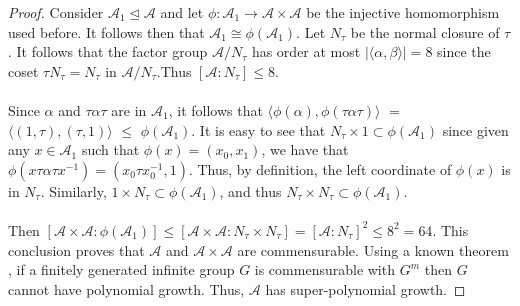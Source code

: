 \documentclass[11pt]{amsart}
\theoremstyle{definition}
\theoremstyle{remark}
\numberwithin{equation}{section}
\begin{document}
\begin{proof}
Consider $\mathcal{A}_1 \unlhd \mathcal{A}$ and let $ \phi \colon \mathcal{A}_1 \to \mathcal{A} \times \mathcal{A}$ be the injective homomorphism used before. It follows then that $\mathcal{A}_1 \cong \phi(\mathcal{A}_1)$. Let $N_{\tau}$ be the normal closure of $\tau$. It follows that the factor group $\mathcal{A}/N_{\tau}$ has order at most $ |\langle \alpha, \beta \rangle| = 8 $ since the coset $ \tau N_{\tau} = N_{\tau}$ in $ \mathcal{A}/N_{\tau} $.Thus $ [ \mathcal{A} \colon N_{\tau} ] \leq 8 $. \\ \\ Since $\alpha$ and $ \tau \alpha \tau $ are in $\mathcal{A}_1$, it follows that $\langle \phi(\alpha), \phi( \tau \alpha \tau ) \rangle$ $=$ $\langle (1, \tau), (\tau, 1) \rangle$  $\leq$ $\phi(\mathcal{A}_1)$. It is easy to see that $ N_{\tau} \times 1 \subset \phi(\mathcal{A}_1)$ since given any $x \in \mathcal{A}_1$ such that $\phi(x) = (x_{0},x_{1})$, we have that $\phi(x \tau \alpha \tau x^{-1}) = (x_{0}\tau x^{-1}_{0}, 1)$. Thus, by definition, the left coordinate of $\phi(x)$ is in $N_{\tau}$. Similarly, $1 \times N_{\tau} \subset \phi(\mathcal{A}_1)$, and thus $N_{\tau} \times N_{\tau} \subset \phi(\mathcal{A}_1)$.  \\ \\
Then $[\mathcal{A} \times \mathcal{A} : \phi(\mathcal{A}_1)] \leq [\mathcal{A} \times \mathcal{A} : N_\tau \times N_\tau] = [\mathcal{A} : N_\tau]^2 \leq 8^2 = 64$. This conclusion proves that $\mathcal{A}$ and $\mathcal{A} \times \mathcal{A}$ are commensurable. Using a known theorem \cite{Terp}, if a finitely generated infinite group $G$ is commensurable with $G^m$ then $G$ cannot have polynomial growth. Thus, $\mathcal{A}$ has super-polynomial growth. 
\end{proof}
\newpage
\end{document}
